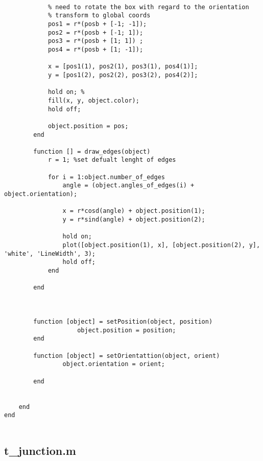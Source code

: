 \begin{lstlisting}
            
            % need to rotate the box with regard to the orientation
            % transform to global coords
            pos1 = r*(posb + [-1; -1]);
            pos2 = r*(posb + [-1; 1]);
            pos3 = r*(posb + [1; 1]) ;
            pos4 = r*(posb + [1; -1]);
            
            x = [pos1(1), pos2(1), pos3(1), pos4(1)];
            y = [pos1(2), pos2(2), pos3(2), pos4(2)];
            
            hold on; % 
            fill(x, y, object.color);
            hold off;
            
            object.position = pos;
        end
        
        function [] = draw_edges(object)
            r = 1; %set defualt lenght of edges
            
            for i = 1:object.number_of_edges
                angle = (object.angles_of_edges(i) + object.orientation);
                
                x = r*cosd(angle) + object.position(1);
                y = r*sind(angle) + object.position(2);
             
                hold on;
                plot([object.position(1), x], [object.position(2), y], 'white', 'LineWidth', 3);
                hold off;
            end
        
        end
        
        
        
        function [object] = setPosition(object, position)
                    object.position = position;
        end
        
        function [object] = setOrientattion(object, orient)
                object.orientation = orient;
            
        end
        
        
    end 
end
 

\end{lstlisting}


\subsection{t\_junction.m}

